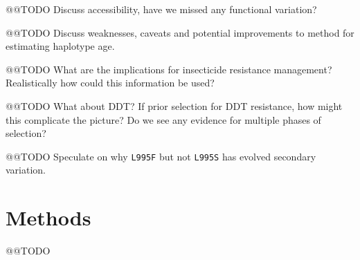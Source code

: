 \documentclass[a4paper,11pt,abstracton]{scrartcl}
\begin{document}
@@TODO Discuss accessibility, have we missed any functional variation?


@@TODO Discuss weaknesses, caveats and potential improvements to method for estimating haplotype age.


@@TODO What are the implications for insecticide resistance management? Realistically how could this information be used?


@@TODO What about DDT? If prior selection for DDT resistance, how might this complicate the picture? Do we see any evidence for multiple phases of selection?


@@TODO Speculate on why \texttt{L995F} but not \texttt{L995S} has evolved secondary variation.


\section*{Methods}

@@TODO


\printbibliography
\end{document}
